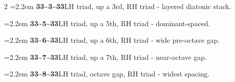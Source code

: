 \documentclass[12pt]{article}
\begin{document}
\begin{multicols}{2}
\noindent\hangindent=2.2em {\juliamono\bfseries 33\textasciitilde{}3\textasciitilde{}33}\enspace\textemdash\enspace LH triad, up a 3rd, RH triad - layered diatonic stack.\par
\noindent\hangindent=2.2em {\juliamono\bfseries 33\textasciitilde{}5\textasciitilde{}33}\enspace\textemdash\enspace LH triad, up a 5th, RH triad - dominant-spaced.\par
\noindent\hangindent=2.2em {\juliamono\bfseries 33\textasciitilde{}6\textasciitilde{}33}\enspace\textemdash\enspace LH triad, up a 6th, RH triad - wide pre-octave gap.\par
\noindent\hangindent=2.2em {\juliamono\bfseries 33\textasciitilde{}7\textasciitilde{}33}\enspace\textemdash\enspace LH triad, up a 7th, RH triad - near-octave gap.\par
\noindent\hangindent=2.2em {\juliamono\bfseries 33\textasciitilde{}8\textasciitilde{}33}\enspace\textemdash\enspace LH triad, octave gap, RH triad - widest spacing.\par
\end{multicols}
\end{document}
